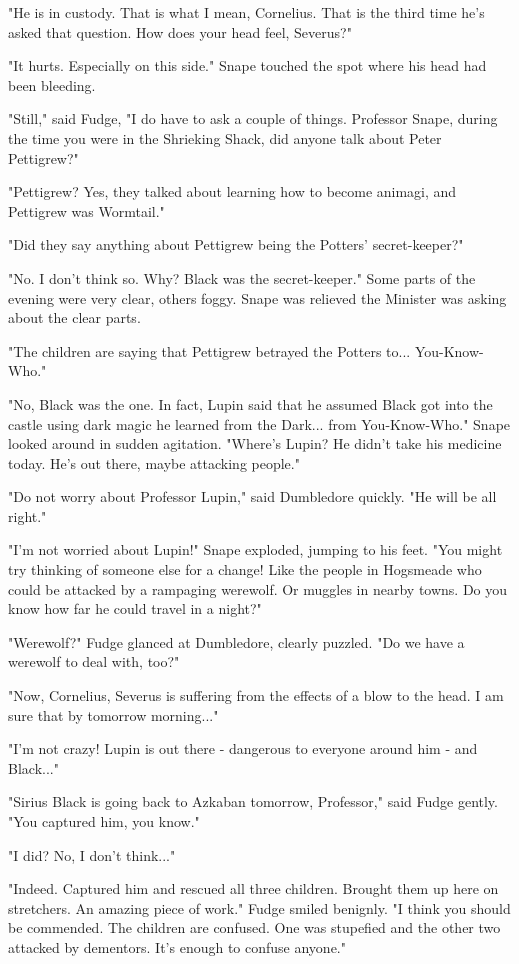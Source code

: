 \documentclass[a4paper,11pt]{article}
\begin{document}
"He is in custody. That is what I mean, Cornelius. That is the third time he's asked that question. How does your head feel, Severus?"

"It hurts. Especially on this side." Snape touched the spot where his head had been bleeding.

"Still," said Fudge, "I do have to ask a couple of things. Professor Snape, during the time you were in the Shrieking Shack, did anyone talk about Peter Pettigrew?"

"Pettigrew? Yes, they talked about learning how to become animagi, and Pettigrew was Wormtail."

"Did they say anything about Pettigrew being the Potters' secret-keeper?"

"No. I don't think so. Why? Black was the secret-keeper." Some parts of the evening were very clear, others foggy. Snape was relieved the Minister was asking about the clear parts.

"The children are saying that Pettigrew betrayed the Potters to... You-Know-Who."

"No, Black was the one. In fact, Lupin said that he assumed Black got into the castle using dark magic he learned from the Dark... from You-Know-Who." Snape looked around in sudden agitation. "Where's Lupin? He didn't take his medicine today. He's out there, maybe attacking people."

"Do not worry about Professor Lupin," said Dumbledore quickly. "He will be all right."

"I'm not worried about Lupin!" Snape exploded, jumping to his feet. "You might try thinking of someone else for a change! Like the people in Hogsmeade who could be attacked by a rampaging werewolf. Or muggles in nearby towns. Do you know how far he could travel in a night?"

"Werewolf?" Fudge glanced at Dumbledore, clearly puzzled. "Do we have a werewolf to deal with, too?"

"Now, Cornelius, Severus is suffering from the effects of a blow to the head. I am sure that by tomorrow morning..."

"I'm not crazy! Lupin is out there - dangerous to everyone around him - and Black..."

"Sirius Black is going back to Azkaban tomorrow, Professor," said Fudge gently. "You captured him, you know."

"I did? No, I don't think..."

"Indeed. Captured him and rescued all three children. Brought them up here on stretchers. An amazing piece of work." Fudge smiled benignly. "I think you should be commended. The children are confused. One was stupefied and the other two attacked by dementors. It's enough to confuse anyone."
\end{document}

